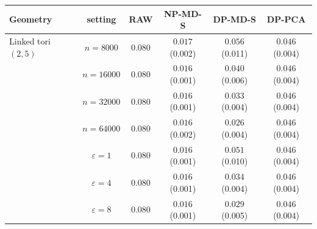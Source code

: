 \begin{tabular}{lccccc}
\toprule
Geometry & setting & RAW & NP-MD-S & DP-MD-S & DP-PCA \\
\midrule
Linked tori $(2,5)$ & $n=8000$ & $0.080$ & $0.017$ \scriptsize(0.002) & $0.056$ \scriptsize(0.011) & $0.046$ \scriptsize(0.004) \\
 & $n=16000$ & $0.080$ & $0.016$ \scriptsize(0.001) & $0.040$ \scriptsize(0.006) & $0.046$ \scriptsize(0.004) \\
 & $n=32000$ & $0.080$ & $0.016$ \scriptsize(0.001) & $0.033$ \scriptsize(0.004) & $0.046$ \scriptsize(0.004) \\
 & $n=64000$ & $0.080$ & $0.016$ \scriptsize(0.002) & $0.026$ \scriptsize(0.004) & $0.046$ \scriptsize(0.004) \\
 & $\varepsilon=1$ & $0.080$ & $0.016$ \scriptsize(0.001) & $0.051$ \scriptsize(0.010) & $0.046$ \scriptsize(0.004) \\
 & $\varepsilon=4$ & $0.080$ & $0.016$ \scriptsize(0.001) & $0.034$ \scriptsize(0.004) & $0.046$ \scriptsize(0.004) \\
 & $\varepsilon=8$ & $0.080$ & $0.016$ \scriptsize(0.001) & $0.029$ \scriptsize(0.005) & $0.046$ \scriptsize(0.004) \\
\bottomrule
\end{tabular}
